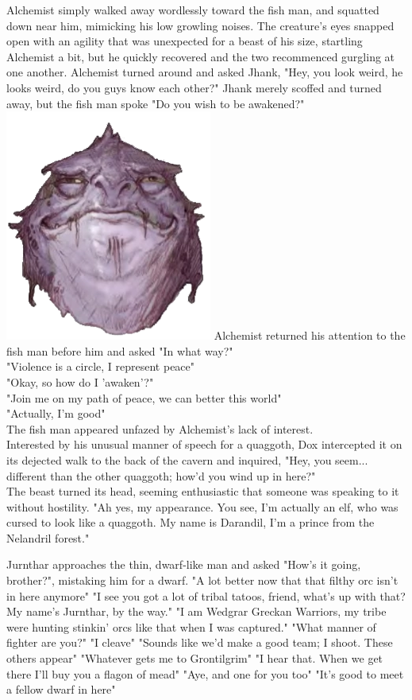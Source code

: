 \documentclass[letterpaper,10pt,twoside,twocolumn,openany]{book}
\begin{document}
Alchemist simply walked away wordlessly toward the fish man, and squatted down near him, mimicking his low growling noises. The creature's eyes snapped open with an agility that was unexpected for a beast of his size, startling Alchemist a bit, but he quickly recovered and the two recommenced gurgling at one another. Alchemist turned around and asked Jhank, "Hey, you look weird, he looks weird, do you guys know each other?" Jhank merely scoffed and turned away, but the fish man spoke "Do you wish to be awakened?"\\
	{\centering
	\includegraphics[width=0.5\linewidth]{img/dist/fish_man.png}
	}
Alchemist returned his attention to the fish man before him and asked "In what way?"\\
"Violence is a circle, I represent peace"\\
"Okay, so how do I 'awaken'?"\\
"Join me on my path of peace, we can better this world"\\
"Actually, I'm good"\\
The fish man appeared unfazed by Alchemist's lack of interest.\\

Interested by his unusual manner of speech for a quaggoth, Dox intercepted it on its dejected walk to the back of the cavern and inquired, "Hey, you seem... different than the other quaggoth; how'd you wind up in here?"\\
The beast turned its head, seeming enthusiastic that someone was speaking to it without hostility. "Ah yes, my appearance. You see, I'm actually an elf, who was cursed to look like a quaggoth. My name is Darandil, I'm a prince from the Nelandril forest."

Jurnthar approaches the thin, dwarf-like man and asked "How's it going, brother?", mistaking him for a dwarf. "A lot better now that that filthy orc isn't in here anymore"
"I see you got a lot of tribal tatoos, friend, what's up with that? My name's Jurnthar, by the way."
"I am Wedgrar Greckan Warriors, my tribe were hunting stinkin' orcs like that when I was captured."
"What manner of fighter are you?"
"I cleave"
"Sounds like we'd make a good team; I shoot. These others appear"
"Whatever gets me to Grontilgrim"
"I hear that. When we get there I'll buy you a flagon of mead"
"Aye, and one for you too"
"It's good to meet a fellow dwarf in here"
\end{document}
